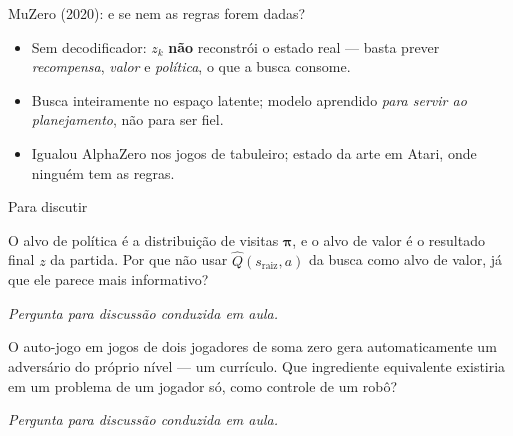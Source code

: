 \documentclass[aspectratio=169, 11pt]{beamer}
\newcommand{\paradiscussao}{\smallskip
  {\footnotesize\color{rlCinza}\itshape Pergunta para discussão conduzida em aula.}}
\newcommand{\Qh}{\widehat{Q}}                   %
\newcommand{\raiz}{s_{\mathrm{raiz}}}
\begin{document}
\begin{frame}{MuZero (2020): e se nem as regras forem dadas?}
  \centering

  \vfill
  \raggedright
  \begin{itemize}
    \item Sem decodificador: $z_k$ \textbf{não} reconstrói o estado real — basta prever \emph{recompensa}, \emph{valor} e \emph{política}, o que a busca consome.
    \item Busca inteiramente no espaço latente; modelo aprendido \emph{para servir ao planejamento}, não para ser fiel.
    \item Igualou AlphaZero nos jogos de tabuleiro; estado da arte em Atari, onde ninguém tem as regras.
  \end{itemize}
\end{frame}

\begin{frame}{Para discutir}
  \begin{quizbox}{}
    O alvo de política é a distribuição de visitas $\bm{\pi}$, e o alvo de valor
    é o resultado final $z$ da partida. Por que não usar $\Qh(\raiz, a)$ da busca
    como alvo de valor, já que ele parece mais informativo?
  \end{quizbox}
  \paradiscussao

  \pause
  \vfill
  \vspace{-2.5pt}
  \begin{quizbox}{}
    O auto-jogo em jogos de dois jogadores de soma zero gera automaticamente um
    adversário do próprio nível --- um currículo. Que ingrediente equivalente
    existiria em um problema de um jogador só, como controle de um robô?
  \end{quizbox}
  \paradiscussao
\end{frame}
\end{document}
